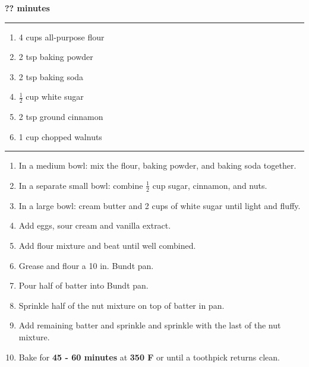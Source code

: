  \hfill {\large \textbf{?? minutes}}
\vspace{15pt}
\hrule
\vspace{15pt}
\begin{enumerate}
	\item 4 cups all-purpose flour
	\item 2 tsp baking powder
	\item 2 tsp baking soda
	\item $\frac{1}{2}$ cup white sugar
	\item 2 tsp ground cinnamon
	\item 1 cup chopped walnuts
\end{enumerate}

\vspace{15pt}
\hrule
\vspace{15pt}
\begin{enumerate}
	\item In a medium bowl: mix the flour, baking powder, and baking soda together.
	\item In a separate small bowl: combine $\frac{1}{2}$ cup sugar, cinnamon, and nuts.
	\item In a large bowl: cream butter and 2 cups of white sugar until light and fluffy.
	\item Add eggs, sour cream and vanilla extract.
	\item Add flour mixture and beat until well combined.
	\item Grease and flour a 10 in. Bundt pan.
	\item Pour half of batter into Bundt pan.
	\item Sprinkle half of the nut mixture on top of batter in pan.
	\item Add remaining batter and sprinkle and sprinkle with the last of the nut mixture.
	\item Bake for \textbf{45 - 60 minutes} at \textbf{350 F} or until a toothpick returns clean.
\end{enumerate}
